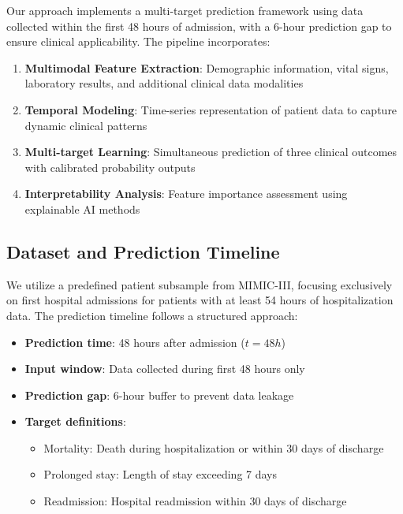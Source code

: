\documentclass[11pt]{article}
\begin{document}
Our approach implements a multi-target prediction framework using data collected within the first 48 hours of admission, with a 6-hour prediction gap to ensure clinical applicability. The pipeline incorporates:

\begin{enumerate}
    \item \textbf{Multimodal Feature Extraction}: Demographic information, vital signs, laboratory results, and additional clinical data modalities
    \item \textbf{Temporal Modeling}: Time-series representation of patient data to capture dynamic clinical patterns
    \item \textbf{Multi-target Learning}: Simultaneous prediction of three clinical outcomes with calibrated probability outputs
    \item \textbf{Interpretability Analysis}: Feature importance assessment using explainable AI methods
\end{enumerate}

\subsection{Dataset and Prediction Timeline}

We utilize a predefined patient subsample from MIMIC-III, focusing exclusively on first hospital admissions for patients with at least 54 hours of hospitalization data. The prediction timeline follows a structured approach:

\begin{itemize}
    \item \textbf{Prediction time}: 48 hours after admission ($t = 48h$)
    \item \textbf{Input window}: Data collected during first 48 hours only
    \item \textbf{Prediction gap}: 6-hour buffer to prevent data leakage
    \item \textbf{Target definitions}:
    \begin{itemize}
        \item Mortality: Death during hospitalization or within 30 days of discharge
        \item Prolonged stay: Length of stay exceeding 7 days
        \item Readmission: Hospital readmission within 30 days of discharge
    \end{itemize}
\end{itemize}
\end{document}
